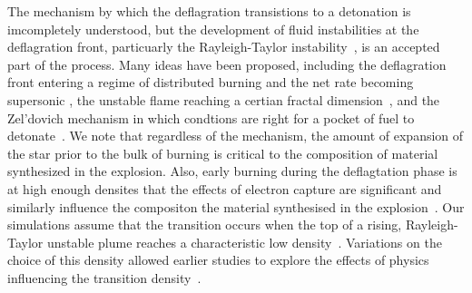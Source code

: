 \documentclass[iop,apj]{emulateapj}
\begin{document}

The mechanism by which the deflagration transistions to a detonation
is imcompletely understood, but the development of fluid instabilities
at the deflagration front, particuarly the Rayleigh-Taylor 
instability~\citep{taylor+50,chandra+81}, is an accepted part of the process.
Many ideas have been proposed, including the deflagration front
entering a regime of distributed burning and the net
rate becoming supersonic \citep{NiemWoos97}, the unstable
flame reaching a certian fractal dimension~\citep{woosley90},
and the Zel'dovich mechanism in which condtions are right for
a pocket of fuel to 
detonate~\citep{zeldovichetal1970,KhokOranWhee97,jacketal2014}.
We note that regardless of
the mechanism, the amount of expansion of the star prior to the bulk of burning
is critical to the composition of material synthesized in the explosion. Also,
early burning during the deflagtation phase is at high enough densites that
the effects of electron capture are significant and similarly influence the 
compositon the material synthesised in the explosion~\citep{hoeflichetal2004,
hoeflich2006,fesenetal2007,diamondetal2018}.
Our simulations assume that the transition occurs when the top of a 
rising, Rayleigh-Taylor unstable plume reaches a characteristic low
density~\citep{townsley.calder.ea:flame}. 
Variations on the choice of this density allowed earlier studies to explore
the effects of physics influencing the transition 
density~\citep{jacketal2010,Krueger2010On-Variations-o,kruegetal12}. 
\end{document}
